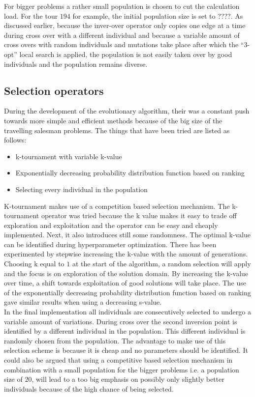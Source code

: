 \documentclass[a4paper,10pt]{article}
\begin{document}
For bigger problems a rather small population is chosen to cut the calculation load. For the tour $194$ for example, the initial population size is set to ????. As discussed earlier, because the inver-over operator only copies one edge at a time during cross over with a different individual and because a variable amount of cross overs with random individuals and mutations take place after which the ``3-opt'' local search is applied, the population is not easily taken over by good individuals and the population remains diverse.


\subsection{Selection operators}

During the development of the evolutionary algorithm, their was a constant push towards more simple and efficient methods because of the big size of the travelling salesman problems. The things that have been tried are listed as follows:

\begin{itemize}
	\item k-tournament with variable k-value
	\item Exponentially decreasing probability distribution function based on ranking
	\item Selecting every individual in the population 
\end{itemize}

K-tournament makes use of a competition based selection mechanism. The k-tournament operator was tried because the k value makes it easy to trade off exploration and exploitation and the operator can be easy and cheaply implemented. Next, it also introduces still some randomness. The optimal k-value can be identified during hyperparameter optimization. There has been experimented by stepwise increasing the k-value with the amount of generations. Choosing k equal to $1$ at the start of the algorithm, a random selection will apply and the focus is on exploration of the solution domain. By increasing the k-value over time, a shift towards exploitation of good solutions will take place. The use of the exponentially decreasing probability distribution function based on ranking gave similar results when using a decreasing s-value.\\

In the final implementation all individuals are consecutively selected to undergo a variable amount of variations. During cross over the second inversion point is identified by a different individual in the population. This different individual is randomly chosen from the population. The advantage to make use of this selection scheme is because it is cheap and no parameters should be identified. It could also be argued that using a competitive based selection mechanism in combination with a small population for the bigger problems i.e. a population size of $20$, will lead to a too big emphasis on possibly only slightly better individuals because of the high chance of being selected. 
\end{document}
